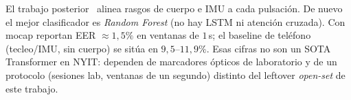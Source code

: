 El trabajo posterior~\cite{cariello2026keystroke} alinea rasgos de cuerpo e IMU a cada pulsación. De nuevo
el mejor clasificador es \textit{Random Forest} (no hay LSTM ni atención cruzada). Con mocap reportan EER
$\approx 1{,}5\%$ en ventanas de $1$\,s; el baseline de teléfono (tecleo/IMU, sin cuerpo) se sitúa en
$9{,}5$--$11{,}9\%$. Esas cifras no son un SOTA Transformer en NYIT: dependen de marcadores ópticos de
laboratorio y de un protocolo (sesiones lab, ventanas de un segundo) distinto del leftover \textit{open-set}
de este trabajo.
